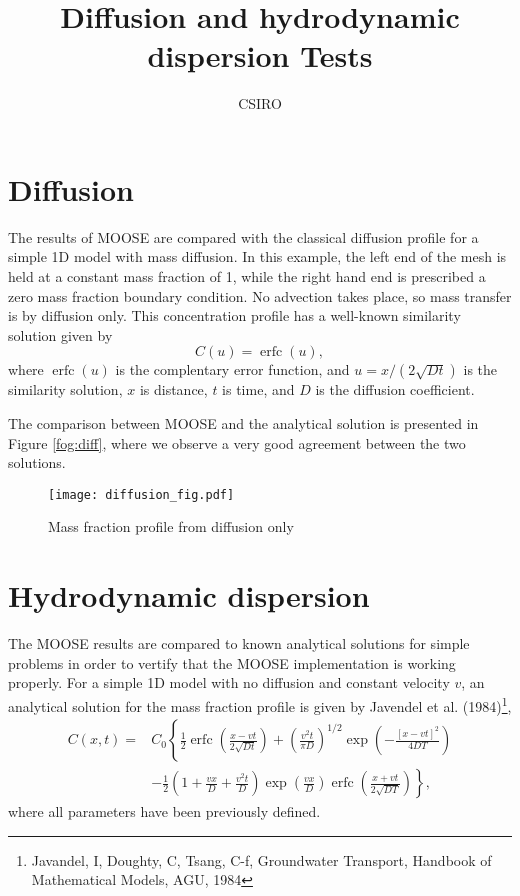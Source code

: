 \documentclass[]{report}
\DeclareMathOperator{\erfc}{erfc}
\begin{document}
\title{Diffusion and hydrodynamic dispersion Tests}
\author{CSIRO}
\maketitle

\tableofcontents

\chapter{Diffusion}

The results of MOOSE are compared with the classical diffusion profile
for a simple 1D model with mass diffusion. In this example, the left end of
the mesh is held at a constant mass fraction of 1, while the right hand end is
prescribed a zero mass fraction boundary condition. No advection takes place, so
mass transfer is by diffusion only. This concentration profile has a well-known
similarity solution given by
\begin{equation}
C(u) = \erfc(u),
\end{equation}
where $\erfc(u)$ is the complentary error function, and $u = x/(2 \sqrt{D t})$ is the
similarity solution, $x$ is distance, $t$ is time, and $D$ is the diffusion coefficient.

The comparison between MOOSE and the analytical solution is presented in Figure \ref{fog:diff}, where we observe a very good agreement between the two solutions.
\begin{figure}[htb]
\centering
\texttt{[image: diffusion\_fig.pdf]}
\caption{Mass fraction profile from diffusion only}
\label{fig:diff}
\end{figure}

\chapter{Hydrodynamic dispersion}

The MOOSE results are compared to known analytical solutions for simple problems in order to vertify that the MOOSE implementation is working properly. For a simple 1D model with no diffusion and constant velocity $v$, an analytical solution for the mass fraction profile is given by Javendel et al. (1984)\footnote{Javandel, I, Doughty, C, Tsang, C-f, Groundwater Transport, Handbook of Mathematical Models, AGU, 1984},
\begin{align}
C(x, t) = & C_0 \left\{ \frac{1}{2} \erfc\left(\frac{x- v t}{2 \sqrt{D t}}\right) + \left(\frac{v^2 t}{\pi D}\right)^{1/2}
\exp \left(- \frac{\left[x - vt\right]^2}{4 D T}\right)\right. \nonumber \\
& - \left. \frac{1}{2} \left(1 + \frac{v x}{D} + \frac{v^2 t}{D} \right) \exp\left(\frac{v x}{D}\right) \erfc\left(\frac{x+v t}{2 \sqrt{D T}}\right)\right\},
\end{align}
where all parameters have been previously defined.
\end{document}
